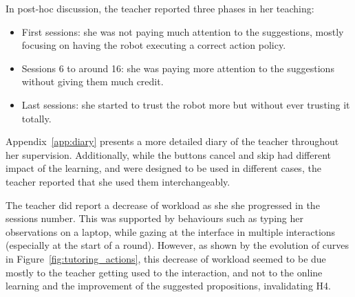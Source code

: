 In post-hoc discussion, the teacher reported three phases in her teaching: 
\begin{itemize}
	\item First sessions: she was not paying much attention to the suggestions, mostly focusing on having the robot executing a correct action policy.
	\item Sessions 6 to around 16: she was paying more attention to the suggestions without giving them much credit.
	\item Last sessions: she started to trust the robot more but without ever trusting it totally.
\end{itemize}

Appendix~\ref{app:diary} presents a more detailed diary of the teacher throughout her supervision. Additionally, while the buttons cancel and skip had different impact of the learning, and were designed to be used in different cases, the teacher reported that she used them interchangeably.

The teacher did report a decrease of workload as she she progressed in the sessions number. This was supported by behaviours such as typing her observations on a laptop, while gazing at the interface in multiple interactions (especially at the start of a round). However, as shown by the evolution of curves in Figure~\ref{fig:tutoring_actions}, this decrease of workload seemed to be due mostly to the teacher getting used to the interaction, and not to the online learning and the improvement of the suggested propositions, invalidating H4.

